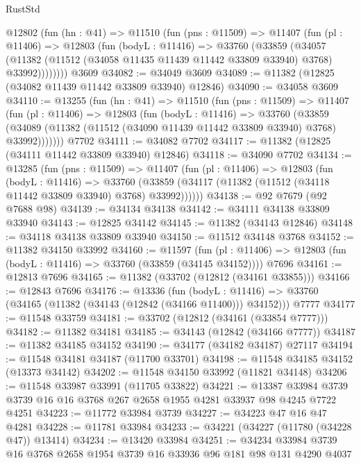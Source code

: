 \begin{lexlean}{RustStd}
\begin{coremodule}
    @12802
      (fun (hn : @41) =>
      @11510
        (fun (pns : @11509) =>
        @11407
          (fun (pl : @11406) =>
          @12803
            (fun (bodyL : @11416) =>
            @33760
              (@33859
                (@34057
                  (@11382 (@11512 (@34058 @11435 @11439 @11442 @33809 @33940) @3768) @33992))))))))
    @3609
@34082 := @34049 @3609
@34089 := @11382 (@12825 (@34082 @11439 @11442 @33809 @33940) @12846)
@34090 := @34058 @3609
@34110 := @13255
    (fun (hn : @41) =>
    @11510
      (fun (pns : @11509) =>
      @11407
        (fun (pl : @11406) =>
        @12803
          (fun (bodyL : @11416) =>
          @33760
            (@33859
              (@34089 (@11382 (@11512 (@34090 @11439 @11442 @33809 @33940) @3768) @33992)))))))
    @7702
@34111 := @34082 @7702
@34117 := @11382 (@12825 (@34111 @11442 @33809 @33940) @12846)
@34118 := @34090 @7702
@34134 := @13285
    (fun (pns : @11509) =>
    @11407
      (fun (pl : @11406) =>
      @12803
        (fun (bodyL : @11416) =>
        @33760 (@33859 (@34117 (@11382 (@11512 (@34118 @11442 @33809 @33940) @3768) @33992))))))
@34138 := @92 @7679 (@92 @7688 @98)
@34139 := @34134 @34138
@34142 := @34111 @34138 @33809 @33940
@34143 := @12825 @34142
@34145 := @11382 (@34143 @12846)
@34148 := @34118 @34138 @33809 @33940
@34150 := @11512 @34148 @3768
@34152 := @11382 @34150 @33992
@34160 := @11597
    (fun (pl : @11406) => @12803 (fun (bodyL : @11416) => @33760 (@33859 (@34145 @34152))))
    @7696
@34161 := @12813 @7696
@34165 := @11382 (@33702 (@12812 (@34161 @33855)))
@34166 := @12843 @7696
@34176 := @13336
    (fun (bodyL : @11416) => @33760 (@34165 (@11382 (@34143 (@12842 (@34166 @11400))) @34152)))
    @7777
@34177 := @11548 @33759
@34181 := @33702 (@12812 (@34161 (@33854 @7777)))
@34182 := @11382 @34181
@34185 := @34143 (@12842 (@34166 @7777))
@34187 := @11382 @34185 @34152
@34190 := @34177 (@34182 @34187) @27117
@34194 := @11548 @34181 @34187 (@11700 @33701)
@34198 := @11548 @34185 @34152 (@13373 @34142)
@34202 := @11548 @34150 @33992 (@11821 @34148)
@34206 := @11548 @33987 @33991 (@11705 @33822)
@34221 := @13387
    @33984
    @3739
    @3739
    @16
    @16
    @3768
    @267
    @2658
    @1955
    @4281
    @33937
    @98
    @4245
    @7722
    @4251
@34223 := @11772 @33984 @3739
@34227 := @34223 @47 @16 @47 @4281
@34228 := @11781 @33984
@34233 := @34221 (@34227 (@11780 (@34228 @47)) @13414)
@34234 := @13420 @33984
@34251 := @34234
    @33984
    @3739
    @16
    @3768
    @2658
    @1954
    @3739
    @16
    @33936
    @96
    @181
    @98
    @131
    @4290
    @4037

\end{coremodule}
\end{lexlean}
